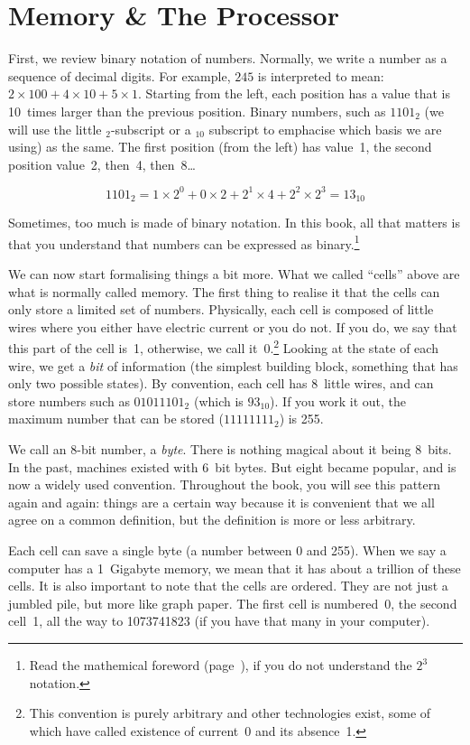 \section{Memory \& The Processor}

First, we review binary notation of numbers. Normally, we write a number as a
sequence of decimal digits. For example, $245$ is interpreted to mean: $2
\times 100 + 4 \times 10 + 5 \times 1$. Starting from the left, each position
has a value that is 10~times larger than the previous position. Binary numbers,
such as $1101_2$ (we will use the little $_2$-subscript or a $_{10}$ subscript
to emphacise which basis we are using) as the same. The first position (from
the left) has value~1, the second position value~2, then~4, then~8\ldots

\[
1101_2 = 1 \times 2^{0}  + 0 \times 2 + 2^1 \times 4 + 2^2 \times 2^3 = 13_{10}
\]

Sometimes, too much is made of binary notation. In this book, all that matters
is that you understand that numbers can be expressed as binary.\footnote{Read
the mathemical foreword (page~\pageref{chpt:mathforeword}), if you do not
understand the $2^3$ notation.}

We can now start formalising things a bit more. What we called ``cells'' above
are what is normally called memory. The first thing to realise it that the
cells can only store a limited set of numbers. Physically, each cell is
composed of little wires where you either have electric current or you do not.
If you do, we say that this part of the cell is~1, otherwise, we call
it~0.\footnote{This convention is purely arbitrary and other technologies
exist, some of which have called existence of current~0 and its absence~1.}
Looking at the state of each wire, we get a \emph{bit} of information (the
simplest building block, something that has only two possible states). By
convention, each cell has 8~little wires, and can store numbers such as
$01011101_2$ (which is $93_{10}$). If you work it out, the maximum number that
can be stored ($11111111_2$) is 255.

We call an 8-bit number, a \emph{byte}. There is nothing magical about it being
8~bits. In the past, machines existed with 6~bit bytes. But eight became
popular, and is now a widely used convention. Throughout the book, you will see
this pattern again and again: things are a certain way because it is convenient
that we all agree on a common definition, but the definition is more or less
arbitrary.

Each cell can save a single byte (a number between 0 and 255). When we say a
computer has a 1~Gigabyte memory, we mean that it has about a trillion of these
cells. It is also important to note that the cells are ordered. They are not
just a jumbled pile, but more like graph paper. The first cell is numbered~0,
the second cell~1, all the way to 1073741823 (if you have that many in your
computer).

